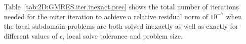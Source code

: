 %
%
Table~\ref{tab:2D:GMRES.iter.inexact.prec} %
shows the total number of iterations needed for the outer iteration to achieve a relative residual norm  of $10^{-7}$ when the local subdomain problems are both solved inexactly as well as exactly for different values of $\epsilon$, local solve tolerance and problem size.
%
